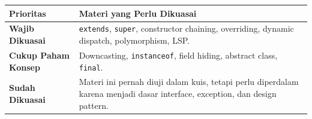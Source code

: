 \begin{tabularx}{\textwidth}{|L{0.22\textwidth}|X|}
\hline
\textbf{Prioritas} & \textbf{Materi yang Perlu Dikuasai} \\
\hline
\textbf{Wajib Dikuasai} & \texttt{extends}, \texttt{super}, constructor chaining, overriding, dynamic dispatch, polymorphism, LSP. \\
\hline
\textbf{Cukup Paham Konsep} & Downcasting, \texttt{instanceof}, field hiding, abstract class, \texttt{final}. \\
\hline
\textbf{Sudah Dikuasai} & Materi ini pernah diuji dalam kuis, tetapi perlu diperdalam karena menjadi dasar interface, exception, dan design pattern. \\
\hline
\end{tabularx}
